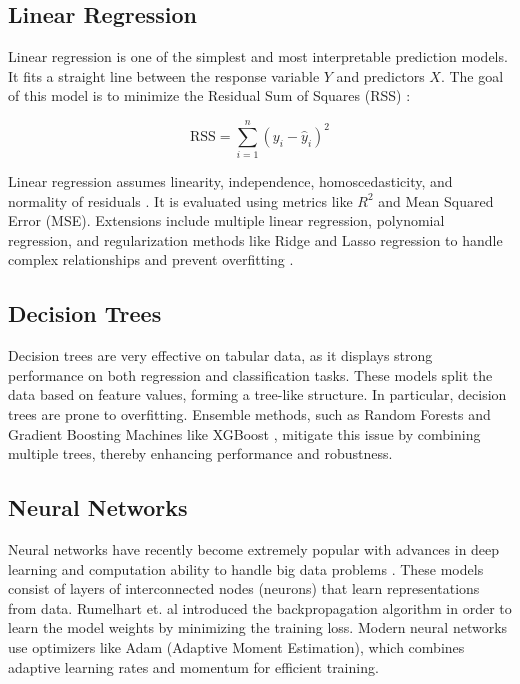 \documentclass[conference]{IEEEtran}
\begin{document}
\subsection{Linear Regression}

Linear regression is one of the simplest and most interpretable prediction models. It fits a straight line between the response variable $Y$ and predictors $X$. The goal of this model is to minimize the Residual Sum of Squares (RSS) \cite{Seber}:

\[
\text{RSS} = \sum_{i=1}^n (y_i - \hat{y}_i)^2
\]

Linear regression assumes linearity, independence, homoscedasticity, and normality of residuals \cite{Kutner}. It is evaluated using metrics like $R^2$ and Mean Squared Error (MSE). Extensions include multiple linear regression, polynomial regression, and regularization methods like Ridge and Lasso regression to handle complex relationships and prevent overfitting \cite{Wright, Weisberg}.

\subsection{Decision Trees}

Decision trees are very effective on tabular data, as it displays strong performance on both regression and classification tasks. These models split the data based on feature values, forming a tree-like structure. In particular, decision trees are prone to overfitting. Ensemble methods, such as Random Forests \cite{Breiman} and Gradient Boosting Machines like XGBoost \cite{Chen}, mitigate this issue by combining multiple trees, thereby enhancing performance and robustness.

\subsection{Neural Networks}

Neural networks have recently become extremely popular with advances in deep learning and computation ability to handle big data problems \cite{LeCun}. These models consist of layers of interconnected nodes (neurons) that learn representations from data. Rumelhart et. al \cite{Rumelhart} introduced the backpropagation algorithm in order to learn the model weights by minimizing the training loss. Modern neural networks use optimizers like Adam (Adaptive Moment Estimation), which combines adaptive learning rates and momentum for efficient training.
\end{document}

